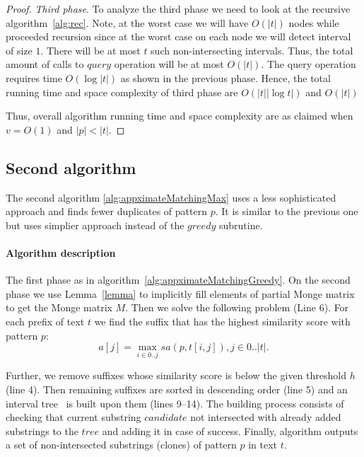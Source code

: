 \begin{proof}
\emph{Third phase}.
To analyze the third phase we need to look at the recursive algorithm~\ref{alg:rec}.
Note, at the worst case we will have $O(|t|)$ nodes while proceeded recursion since at the worst case on each node we will detect interval of size $1$.
There will be at most $t$ such non-intersecting intervals.
Thus, the total amount of calls to $query$ operation will be at most $O(|t|)$.
The query operation requires time $O(\log |t|)$ as shown in the previous phase.
Hence, the total running time and space complexity of third phase are $O(|t| |\log t|)$ and $O(|t|)$  

Thus, overall algorithm running time and space complexity are as claimed when $v=O(1)$ and $|p|<|t|$.
\end{proof}

\subsection{Second algorithm}
The second algorithm \ref{alg:appximateMatchingMax} uses a less sophisticated approach and finds fewer duplicates of pattern $p$.
It is similar to the previous one but uses simplier approach instead of the $greedy$ subrutine.

\paragraph{Algorithm description}

The first phase as in algorithm~\ref{alg:appximateMatchingGreedy}.
On the second phase we use Lemma~\ref{lemma} to implicitly fill elements of partial Monge matrix to get the Monge matrix $M$.
Then we solve the following problem (Line 6).
For each prefix of text $t$ we find the suffix that has the highest similarity score with pattern $p$:
$$ a[j] = \max _{i \in 0 ..j} sa(p,t[i,j]), j \in 0..|t|.$$

Further, we remove suffixes whose similarity score is below the given threshold $h$ (line 4).
Then remaining suffixes are sorted in descending order (line 5) and an interval tree~\cite{.} is built upon them (lines 9--14).
The building process consists of checking that current substring $candidate$ not intersected with already added substrings to the $tree$ and adding it in case of success.
Finally, algorithm outputs a set of non-intersected substrings (clones) of pattern $p$ in text $t$.

